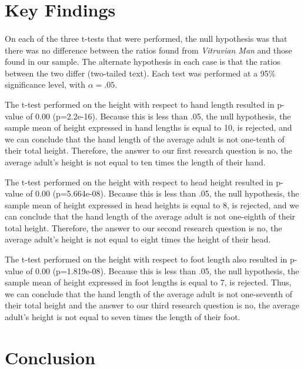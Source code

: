\documentclass[]{article}
\begin{document}
\section{Key Findings}
\label{sec:findings}
\paragraph{}

On each of the three t-tests that were performed, the null hypothesis
was that there was no difference between the ratios found from
\emph{Vitruvian Man} and those found in our sample. The alternate
hypothesis in each case is that the ratios between the two differ
(two-tailed text). Each test was performed at a 95\% significance level,
with \(\alpha = .05\).

The t-test performed on the height with respect to hand length resulted
in p-value of 0.00 (p=2.2e-16). Because this is less than .05, the null
hypothesis, the sample mean of height expressed in hand lengths is equal
to 10, is rejected, and we can conclude that the hand length of the
average adult is not one-tenth of their total height. Therefore, the
answer to our first research question is no, the average adult's height
is not equal to ten times the length of their hand.

The t-test performed on the height with respect to head height resulted
in p-value of 0.00 (p=5.664e-08). Because this is less than .05, the
null hypothesis, the sample mean of height expressed in head heights is
equal to 8, is rejected, and we can conclude that the hand length of the
average adult is not one-eighth of their total height. Therefore, the
answer to our second research question is no, the average adult's height
is not equal to eight times the height of their head.

The t-test performed on the height with respect to foot length also
resulted in p-value of 0.00 (p=1.819e-08). Because this is less than
.05, the null hypothesis, the sample mean of height expressed in foot
lengths is equal to 7, is rejected. Thus, we can conclude that the hand
length of the average adult is not one-seventh of their total height and
the answer to our third research question is no, the average adult's
height is not equal to seven times the length of their foot.

\section{Conclusion}
\label{sec:conclusion}
\paragraph{}
\end{document}
